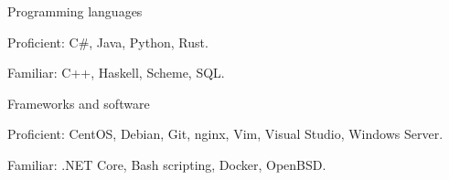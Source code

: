 
\begin{cventries}
  \cventry
    {} %
    {Programming languages} %
    {}
    {}
    {
      \begin{cvitems} %
         \item {Proficient: C\#, Java, Python, Rust.}
         \vspace{0.5mm}
         \item {Familiar: C++, Haskell, Scheme, SQL.}
      \end{cvitems}
    }
    
  \cventry
    {} %
    {Frameworks and software} %
    {}
    {}
    {
      \begin{cvitems} %
         \item {Proficient: CentOS, Debian, Git, nginx, Vim, Visual Studio, Windows Server.}
         \vspace{0.5mm}
         \item {Familiar: .NET Core, Bash scripting, Docker, OpenBSD.}
      \end{cvitems}
    }
\end{cventries}
